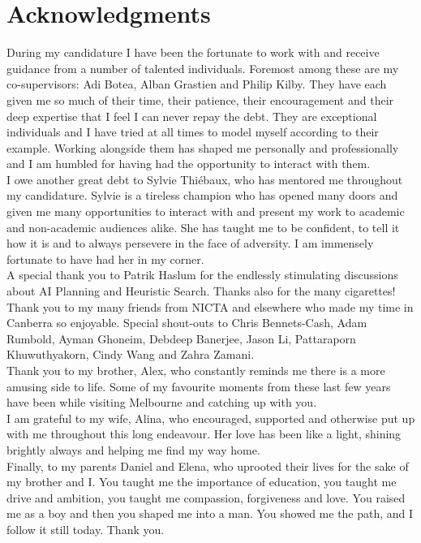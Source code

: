 \chapter*{Acknowledgments}

During my candidature I have been the fortunate to work with and receive
guidance from a number of talented individuals. 
Foremost among these are my co-supervisors: Adi Botea, 
Alban Grastien and Philip Kilby. They have each given me so much of their time, 
their patience, their encouragement and their deep expertise that 
I feel I can never repay the debt. They are exceptional individuals and
I have tried at all times to model myself according to their example.  
Working alongside them has shaped me personally and professionally and I am
humbled for having had the opportunity to interact with them.
\newline \\ 
\noindent 
I owe another great debt to Sylvie Thi{\'e}baux, who has mentored me
throughout my candidature.  Sylvie is a tireless champion who has opened many
doors and given me many opportunities to interact with and present my work to
academic and non-academic audiences alike. She has taught me to be confident,
to tell it how it is and to always persevere in the face of adversity. I am
immensely fortunate to have had her in my corner.
\newline \\ 
\noindent
A special thank you to Patrik Haslum for the endlessly stimulating discussions
about AI Planning and Heuristic Search.  Thanks also for the many cigarettes!
\newline \\ 
\noindent
Thank you to my many friends from NICTA and elsewhere who made my time in Canberra
so enjoyable. Special shout-outs to Chris Bennets-Cash, Adam Rumbold, Ayman Ghoneim, 
Debdeep Banerjee, Jason Li, Pattaraporn Khuwuthyakorn, Cindy Wang and Zahra Zamani. 
\newline \\ 
\noindent
Thank you to my brother, Alex, who constantly reminds me there is a more
amusing side to life. Some of my favourite moments from these last few years have
been while visiting Melbourne and catching up with you.
\newline \\ 
\noindent
I am grateful to my wife, Alina, who encouraged, supported and
otherwise put up with me throughout this long endeavour. Her love has been
like a light, shining brightly always and helping me find my way home.
\newline \\ 
\noindent
Finally, to my parents Daniel and Elena, who uprooted their lives for the sake
of my brother and I.  You taught me the importance of education, you taught me
drive and ambition, you taught me compassion, forgiveness and love. You raised
me as a boy and then you shaped me into a man. You showed me the path, and I
follow it still today. Thank you.

